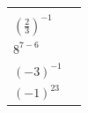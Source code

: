 {\begin{center}
\begin{xtabular*}{\mytablewidth}[t]{|p{10\mystarwidth}|p{10\mystarwidth}|}
                 &
     \tabularnewline{}
                  \begin{math}{\left(\frac{2}{3}\right)}^{-1}\end{math}
                 &
     \tabularnewline{}
                  \begin{math}{8}^{7-6}\end{math}
                 &
     \tabularnewline{}
                  \begin{math}{\left(-3\right)}^{-1}\end{math}
                 &
     \tabularnewline{}
                  \begin{math}{\left(-1\right)}^{23}\end{math}

\end{xtabular*}
\end{center}}
